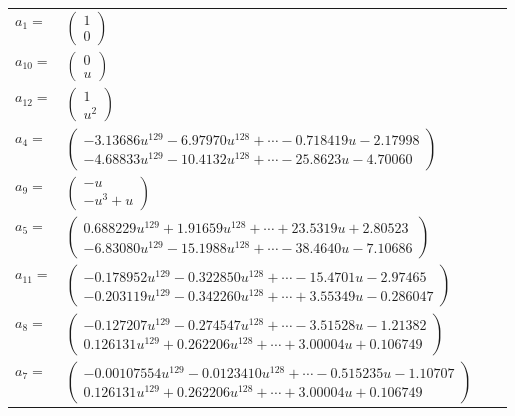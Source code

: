 \documentclass[1p]{elsarticle_modified}
\theoremstyle{definition}
\begin{document}
\begin{tabular}{m{7pt} m{180pt} m{7pt} m{180pt} }
\flushright $a_{1}=$&$\begin{pmatrix}1\\0\end{pmatrix}$ \\
\flushright $a_{10}=$&$\begin{pmatrix}0\\u\end{pmatrix}$ \\
\flushright $a_{12}=$&$\begin{pmatrix}1\\u^2\end{pmatrix}$ \\
\flushright $a_{4}=$&$\begin{pmatrix}-3.13686 u^{129}-6.97970 u^{128}+\cdots-0.718419 u-2.17998\\-4.68833 u^{129}-10.4132 u^{128}+\cdots-25.8623 u-4.70060\end{pmatrix}$ \\
\flushright $a_{9}=$&$\begin{pmatrix}- u\\- u^3+u\end{pmatrix}$ \\
\flushright $a_{5}=$&$\begin{pmatrix}0.688229 u^{129}+1.91659 u^{128}+\cdots+23.5319 u+2.80523\\-6.83080 u^{129}-15.1988 u^{128}+\cdots-38.4640 u-7.10686\end{pmatrix}$ \\
\flushright $a_{11}=$&$\begin{pmatrix}-0.178952 u^{129}-0.322850 u^{128}+\cdots-15.4701 u-2.97465\\-0.203119 u^{129}-0.342260 u^{128}+\cdots+3.55349 u-0.286047\end{pmatrix}$ \\
\flushright $a_{8}=$&$\begin{pmatrix}-0.127207 u^{129}-0.274547 u^{128}+\cdots-3.51528 u-1.21382\\0.126131 u^{129}+0.262206 u^{128}+\cdots+3.00004 u+0.106749\end{pmatrix}$ \\
\flushright $a_{7}=$&$\begin{pmatrix}-0.00107554 u^{129}-0.0123410 u^{128}+\cdots-0.515235 u-1.10707\\0.126131 u^{129}+0.262206 u^{128}+\cdots+3.00004 u+0.106749\end{pmatrix}$ \\

\end{tabular}
\end{document}
